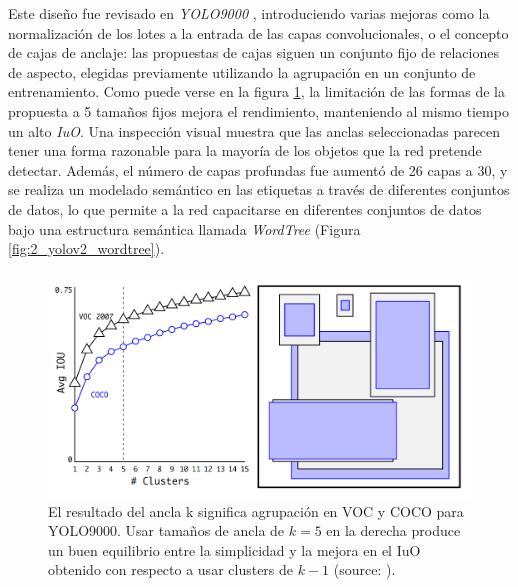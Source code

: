Este diseño fue revisado en \textit{YOLO9000} \cite{yolov2}, introduciendo varias mejoras como la normalización de los lotes a la entrada de las capas convolucionales, o el concepto de cajas de anclaje: las propuestas de cajas siguen un conjunto fijo de relaciones de aspecto, elegidas previamente utilizando la agrupación en un conjunto de entrenamiento. Como puede verse en la figura \ref{fig:2_yolov2_anchor_clustering}, la limitación de las formas de la propuesta a 5 tamaños fijos mejora el rendimiento, manteniendo al mismo tiempo un alto \textit{IuO}. Una inspección visual muestra que las anclas seleccionadas parecen tener una forma razonable para la mayoría de los objetos que la red pretende detectar. Además, el número de capas profundas fue aumentó de 26 capas a 30, y se realiza un modelado semántico en las etiquetas a través de diferentes conjuntos de datos, lo que permite a la red capacitarse en diferentes conjuntos de datos bajo una estructura semántica llamada \textit{WordTree} (Figura \ref{fig:2_yolov2_wordtree}).
\begin{figure}[H]
	\centering
	\includegraphics[width=0.6\linewidth]{figures/estado_arte/yolov2_anchor_clustering.png}
	\caption{El resultado del ancla k significa agrupación en VOC y COCO para YOLO9000. Usar tamaños de ancla de $k=5$ en la derecha produce un buen equilibrio entre la simplicidad y la mejora en el IuO obtenido con respecto a usar clusters de $k-1$ (source: \cite{yolov2}).}
	\label{fig:2_yolov2_anchor_clustering}
\end{figure}

